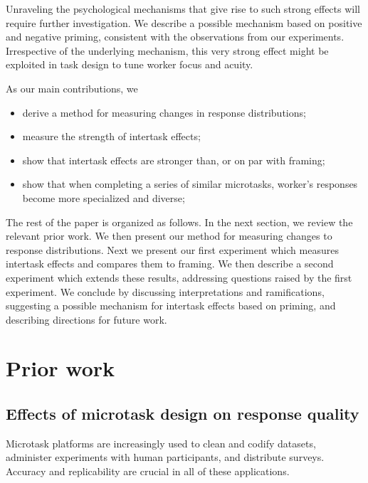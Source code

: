 \documentclass{sigchi}
\begin{document}
Unraveling the psychological mechanisms that give rise to such strong 
effects will require further investigation.  We describe a possible 
mechanism based on positive and negative priming, consistent with the
observations from our experiments.
Irrespective of the underlying mechanism, this very strong effect might 
be exploited in task design to tune worker focus and acuity.

As our main contributions, we
\begin{itemize}[noitemsep,nolistsep]
  \item{
	derive a method for measuring changes in response distributions;
  }
  \item{measure the strength of intertask effects;}
  \item{show that intertask effects are stronger than,
	or on par with framing;}
  \item{
	show that when completing a series of similar microtasks,
	worker's responses become more specialized and diverse;
  }
\end{itemize}

The rest of the paper is organized as follows.  In the next section, we 
review the relevant prior work.  We then present our method for 
measuring changes to response distributions.
Next we present our first experiment which measures intertask effects and
compares them to framing. We then describe a second experiment which 
extends these results, addressing questions raised by the first experiment.
We conclude by discussing interpretations and ramifications, suggesting
a possible mechanism for intertask effects based on priming, and
describing directions for future work.

\pagebreak
\section{Prior work}
\subsection{Effects of microtask design on response quality}
Microtask platforms are increasingly used to clean and codify datasets,
administer experiments with human participants, and distribute 
surveys.  Accuracy and replicability are crucial in all of these 
applications.
\end{document}
